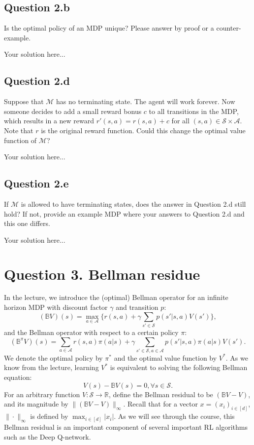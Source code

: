 \documentclass[12pt]{article}
\newcommand*{\bo}{\mathbb{B}}
\begin{document}
\subsection*{Question 2.b}
Is the optimal policy of an MDP unique? Please answer by proof or a counter-example.
\begin{solution}
Your solution here...
\end{solution}
\subsection*{Question 2.d}
Suppose that $\mathcal{M}$ has no terminating state. The agent will work forever. Now someone decides to add a small reward bonus $c$ to all transitions in the MDP, which results in a new reward $r'(s,a) = r(s,a)+c$ for all $(s,a)\in \mathcal{S}\times\mathcal{A}$. Note that $r$ is the original reward function. Could this change the optimal value function of $\mathcal{M}$?
\begin{solution}
    Your solution here...
\end{solution}
\subsection*{Question 2.e}
If $\mathcal{M}$ is allowed to have terminating states, does the answer in Question 2.d still hold? If not,  provide an example MDP where your answers to Question 2.d and this one differs.
\begin{solution}
    Your solution here...
\end{solution}
\section*{Question 3. Bellman residue}
In the lecture, we introduce the (optimal) Bellman operator for an infinite horizon MDP with discount factor $\gamma$ and transition $p$:
$$(\bo V)(s) = \max_{a\in\mathcal{A}} \bigg\{r(s,a) + \gamma \sum_{s'\in\mathcal{S}} p(s'|s,a) V(s')\bigg\},$$
and the Bellman operator with respect to a certain policy $\pi$:
$$(\bo^\pi V)(s) = \sum_{a\in\mathcal{A}} r(s,a)\pi(a|s)+ \gamma \sum_{s'\in\mathcal{S},a\in \mathcal{A}} p(s'|s,a)\pi(a|s) V(s').$$
We denote the optimal policy by $\pi^*$ and the optimal value function by $V^*$. As we know from the lecture, learning $V^*$ is equivalent to solving the following Bellman equation:
$$V(s) -\bo V(s) = 0, \forall s \in \mathcal{S}.$$
For an arbitrary function $V: \mathcal{S} \rightarrow \mathbb{R}$, define the Bellman residual to be $(\bo V - V ) $, and its magnitude by $\|(\bo V - V )\|_\infty$. Recall that for a vector $x = (x_i)_{i\in[d]}$, $\|\cdot\|_\infty$ is defined by $\max_{i\in[d]} |x_i|$. As we will see through the course, this Bellman residual is an important component of several important RL algorithms such as the Deep Q-network. 
\end{document}
